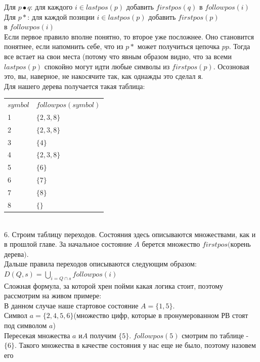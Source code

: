 \documentclass[14pt]{extreport}
\begin{document}
	\hspace*{30pt}Для $p \bullet q$: для каждого $i \in lastpos(p)$ добавить $firstpos(q)$
	в $followpos(i)$\\
	\hspace*{30pt}Для  $p*$: для каждой позиции $i \in lastpos(p)$ добавить $firstpos(p)$\\
	\hspace*{30pt}в $followpos(i)$\\
	Если первое правило вполне понятно, то второе уже посложнее. Оно становится понятнее,
	если напомнить себе, что из $p*$ может получиться цепочка $pp$. Тогда все встает на
	свои места (потому что явным образом видно, что за всеми $lastpos(p)$ спокойно могут
	идти любые символы из $firstpos(p)$. Осозновая это, вы, наверное, не накосячите так,
	как однажды это сделал я.\\
	Для нашего дерева получается такая таблица:\\
		\begin{tabular}{ll}
			 $symbol$ & $followpos(symbol)$ \\
			 1 & $\{2, 3, 8\}$ \\
			 2 & $\{2, 3, 8\}$ \\
			 3 & $\{4\}$ \\
			 4 & $\{2, 3, 8\}$ \\
			 5 & $\{6\}$ \\
			 6 & $\{7\}$\\
			 7 & $\{8\}$\\
			 8 & $\{\}$\\
		\end{tabular}\\
	6. Строим таблицу переходов. Состояния здесь описываются множествами, как и в прошлой главе.
	За начальное состояние $A$ берется множество $firstpos($корень дерева$)$.\\
	Дальше правила переходов описываются следующим образом:\\
	$D(Q, s) = \bigcup\limits_{i=Q \cap s}followpos(i)$\\
	Сложная формула, за которой хрен пойми какая логика стоит, поэтому рассмотрим на живом
	примере:\\
	В данном случае наше стартовое состояние $A=\{1, 5\}$.\\
	Символ $a=\{2, 4, 5, 6\}$(множество	цифр, которые в пронумерованном РВ 
	стоят под символом $a$)\\
	Пересекая множества $a$ и$A$ получим $\{5\}$. $followpos(5)$ смотрим по таблице -
	$\{6\}$. Такого множества в качестве состояния у нас еще не было, поэтому назовем его
\end{document}
